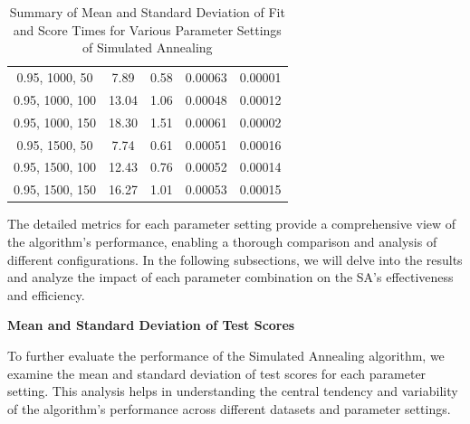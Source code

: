 \documentclass[
]{article}
\begin{document}
\begin{table}[H]
{\begin{tabular}{|c|c|c|c|c|}
                0.95, 1000, 50             & 7.89                   & 0.58                  & 0.00063                  & 0.00001                 \\
                0.95, 1000, 100            & 13.04                  & 1.06                  & 0.00048                  & 0.00012                 \\
                0.95, 1000, 150            & 18.30                  & 1.51                  & 0.00061                  & 0.00002                 \\
                0.95, 1500, 50             & 7.74                   & 0.61                  & 0.00051                  & 0.00016                 \\
                0.95, 1500, 100            & 12.43                  & 0.76                  & 0.00052                  & 0.00014                 \\
                0.95, 1500, 150            & 16.27                  & 1.01                  & 0.00053                  & 0.00015                 \\
                \hline
            \end{tabular}
        }
        \caption{Summary of Mean and Standard Deviation of Fit and Score Times for Various Parameter Settings of Simulated Annealing}
        \label{tab:sa_summary_fit_score_times}
    \end{table}

    The detailed metrics for each parameter setting provide a comprehensive view of the algorithm's performance, enabling a thorough comparison and analysis of different configurations. In the following subsections, we will delve into the results and analyze the impact of each parameter combination on the SA's effectiveness and efficiency.

    \textbf{Mean and Standard Deviation of Test Scores}

    To further evaluate the performance of the Simulated Annealing algorithm, we examine the mean and standard deviation of test scores for each parameter setting. This analysis helps in understanding the central tendency and variability of the algorithm's performance across different datasets and parameter settings.
\end{document}
